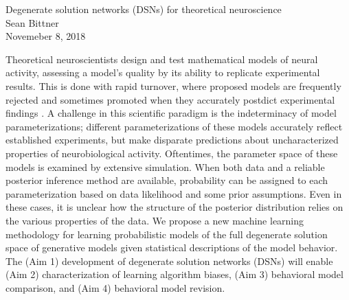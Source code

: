 \documentclass[11pt]{article}
\begin{document}
\medskip                        %

\thispagestyle{plain}
\begin{center}                  %
{\Large Degenerate solution networks (DSNs) for theoretical neuroscience} \\
Sean Bittner \\
Novemeber 8, 2018 \\
\end{center}

Theoretical neuroscientists design and test mathematical models of neural activity, assessing a model’s quality by its ability to replicate experimental results. This is done with rapid turnover, where proposed models are frequently rejected and sometimes promoted when they accurately postdict experimental findings \cite{abbott2008theoretical}.  A challenge in this scientific paradigm is the indeterminacy of model parameterizations; different parameterizations of these models accurately reflect established experiments, but make disparate predictions about uncharacterized properties of neurobiological activity.  Oftentimes, the parameter space of these models is examined by extensive simulation.  When both data and a reliable posterior inference method are available, probability can be assigned to each parameterization based on data likelihood and some prior assumptions.  Even in these cases, it is unclear how the structure of the posterior distribution relies on the various properties of the data.  We propose a new machine learning methodology for learning probabilistic models of the full degenerate solution space of generative models given statistical descriptions of the model behavior.  The (Aim 1) development of degenerate solution networks (DSNs) will enable (Aim 2) characterization of learning algorithm biases, (Aim 3) behavioral model comparison, and (Aim 4) behavioral model revision.
\end{document}
